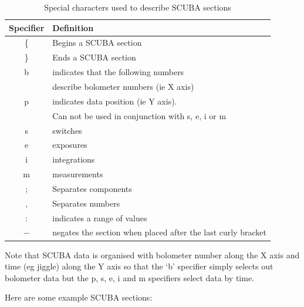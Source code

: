 \documentclass[twoside,11pt]{starlink}
\begin{document}
\begin{table}
\begin{center}
\begin{tabular}{cl}
\hline \hline
Specifier & Definition \\ \hline
\{  & Begins a SCUBA section \\
\}  & Ends a SCUBA section   \\
b  & indicates that the following numbers \\
   & describe bolometer numbers (ie X axis)\\
p  & indicates data position (ie Y axis). \\
   & Can not be used in conjunction with s, e, i or m\\
s  & switches \\
e  & exposures \\
i  & integrations \\
m  & measurements \\
;  & Separates components   \\
,  & Separates numbers \\
:  & indicates a range of values \\
$-$& negates the section when placed after the last curly bracket \\ \hline
\hline
\end{tabular}

\caption{Special characters used to describe SCUBA sections}

\label{scusect}
\end{center}
\end{table}

Note that SCUBA data is organised with bolometer number along the
X axis and time (eg jiggle) along the Y axis so  that the `b' specifier
simply selects out bolometer data but the p, s, e, i and m specifiers select
data by time.

Here are some example SCUBA sections:
\end{document}
